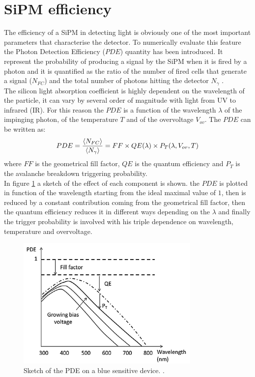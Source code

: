 \section{SiPM efficiency}\label{sec:PDE}
The efficiency of a SiPM in detecting light is obviously one of the most important parameters that characterise the detector. To numerically evaluate this feature the Photon Detection Efficiency ($PDE$) quantity has been introduced. It represent the probability of producing a signal by the SiPM when it is fired by a photon and it is quantified as the ratio of the number of fired cells that generate a signal ($N_{FC}$) and the total number of photons hitting the detector $N_{\gamma}$ \cite{PDE}.\\
The silicon light absorption coefficient is highly dependent on the wavelength of the particle, it can vary by several order of magnitude with light from UV to infrared (IR). For this reason the $PDE$ is a function of the wavelength $\lambda$ of the impinging photon, of the temperature $T$ and of the overvoltage $V_{ov}$. The $PDE$ can be written as:
\begin{equation}
    PDE = \frac{\expval{N_{FC}}}{\expval{N_{\gamma}}} = FF \times QE(\lambda) \times P_T(\lambda,V_{ov},T)
\end{equation}
where $FF$ is the geometrical fill factor, $QE$ is the quantum efficiency and $P_T$ is the avalanche breakdown triggering probability.\\
In figure \ref{fig:PDE} a sketch of the effect of each component is shown. the $PDE$ is plotted in function of the wavelength starting from the ideal maximal value of $1$, then is reduced by a constant contribution coming from the geometrical fill factor, then the quantum efficiency reduces it in different ways depending on the $\lambda$ and finally the trigger probability is involved with his triple dependence on wavelength, temperature and overvoltage.

\begin{figure}
	\centering
	\includegraphics[width=0.8\textwidth]{IMG/Cap3/PDE.png}
	\caption{Sketch of the PDE on a blue sensitive device. \cite{electrics}.}
	\label{fig:PDE}
\end{figure}

